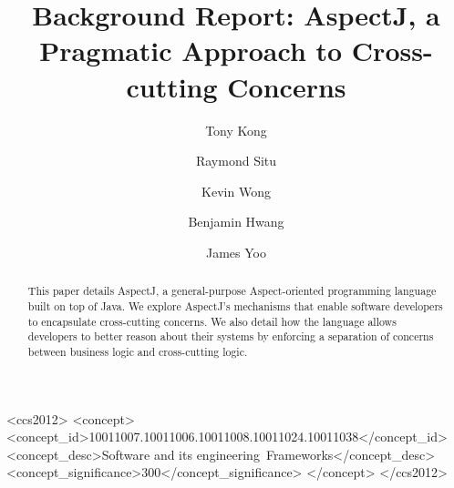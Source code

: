 \documentclass[sigconf]{acmart}
\begin{document}
\title{Background Report: AspectJ, a Pragmatic Approach to Cross-cutting Concerns}

\author{Tony Kong}

\author{Raymond Situ}

\author{Kevin Wong}

\author{Benjamin Hwang}

\author{James Yoo}

\begin{abstract}
This paper details AspectJ, a general-purpose Aspect-oriented programming language built on top of Java. We explore AspectJ's mechanisms that enable software developers to encapsulate cross-cutting concerns. We also detail how the language allows developers to better reason about their systems by enforcing a separation of concerns between business logic and cross-cutting logic.
\end{abstract}

\begin{CCSXML}
<ccs2012>
<concept>
<concept_id>10011007.10011006.10011008.10011024.10011038</concept_id>
<concept_desc>Software and its engineering~Frameworks</concept_desc>
<concept_significance>300</concept_significance>
</concept>
</ccs2012>
\end{CCSXML}

\maketitle
\end{document}
